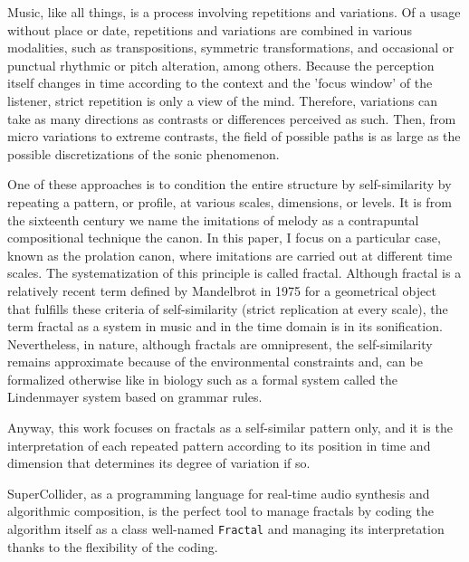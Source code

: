 \documentclass{article}
\begin{document}
Music, like all things, is a process involving repetitions and variations. 
Of a usage without place or date, repetitions and variations are combined in various modalities, such as transpositions, symmetric transformations, and occasional or punctual rhythmic or pitch alteration, among others. 
Because the perception itself changes in time according to the context and the 'focus window' of the listener, strict repetition is only a view of the mind. Therefore, variations can take as many directions as contrasts or differences perceived as such.
Then, from micro variations to extreme contrasts, the field of possible paths is as large as the possible discretizations of the sonic phenomenon.

One of these approaches is to condition the entire structure by self-similarity by repeating a pattern, or profile, at various scales, dimensions, or levels.
It is from the sixteenth century we name the imitations of melody as a contrapuntal compositional technique the canon. In this paper, I focus on a particular case, known as the prolation canon, where imitations are carried out at different time scales\cite{fpm}. 
The systematization of this principle is called fractal. 
Although fractal is a relatively recent term defined by Mandelbrot in 1975\cite{bm} for a geometrical object that fulfills these criteria of self-similarity (strict replication at every scale), the term fractal as a system in music and in the time domain is in its sonification.
Nevertheless, in nature, although fractals are omnipresent, the self-similarity remains approximate because of the environmental constraints and, can be formalized otherwise like in biology such as a formal system called the Lindenmayer system based on grammar rules. 

Anyway, this work focuses on fractals as a self-similar pattern only, and it is the interpretation of each repeated pattern according to its position in time and dimension that determines its degree of variation if so. 

\bigskip

SuperCollider\cite{av}, as a programming language for real-time audio synthesis and algorithmic composition, is the perfect tool to manage fractals by coding the algorithm itself\cite[Section 6.3]{yx} as a class well-named \texttt{Fractal}\cite[\texttt{gsa.quark}]{yx} and managing its interpretation thanks to the flexibility of the coding. 

\bigskip
\end{document}
